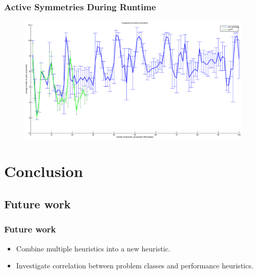 \documentclass{beamer}
\begin{document}
	\begin{frame}[plain]
		\frametitle{Active Symmetries During Runtime}
		\begin{figure}
			\centerline{\includegraphics[width=1.4\textwidth]{../results/battleship-12-23-approx-vs-reg.eps}}
			\label{fig:active_symmetries_during_search}
		\end{figure}
	\end{frame}


\section{Conclusion}

	\subsection{Future work}
	\begin{frame}
		\frametitle{Future work}

		\begin{itemize}
			\item Combine multiple heuristics into a new heuristic.
			\item Investigate correlation between problem classes and performance heuristics.
		\end{itemize}
	\end{frame}
\end{document}
